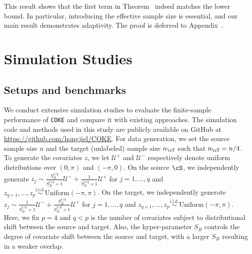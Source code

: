 \documentclass[12pt,a4paper,pdftex,onepage]{article}
\begin{document}
This result shows that the first term in Theorem~ indeed matches the lower bound. In particular, introducing the effective sample size is essential, and our main result demonstrates adaptivity.
The proof is deferred to Appendix~.


\section{Simulation Studies}\label{sec:simu}

\subsection{Setups and benchmarks}

We conduct extensive simulation studies to evaluate the finite-sample performance of \texttt{COKE} and compare it with existing approaches. The simulation code and methods used in this study are publicly available on GitHub at \url{https://github.com/hongjiel/COKE}. For data generation, we set the source sample size $n$ and the target (unlabeled) sample size $n_{\cT}$ such that $n_{\cT}=n/4$. To generate the covariates $z$, we let $\mathcal{U}^+$ and $\mathcal{U}^-$ respectively denote uniform distributions over $(0,\pi)$ and $(-\pi,0)$. On the source $\cS$, we independently generate $z_{j}\sim \frac{S_B^{1/q}}{S_B^{1/q} + 1}\mathcal{U}^-+ \frac{1}{S_B^{1/q} + 1}\mathcal{U}^+$ for $j=1,\ldots,q$ and $z_{q+1}, \ldots, z_{p} \stackrel{\text{i.i.d.}}{\sim} \text{Uniform}(-\pi,\pi)$. On the target, we independently generate $z_{j}\sim \frac{1}{S_B^{1/q} + 1}\mathcal{U}^-+\frac{S_B^{1/q}}{S_B^{1/q} + 1}\mathcal{U}^+$ for $j=1,\ldots,q$ and $z_{q+1}, \ldots, z_{p} \stackrel{\text{i.i.d.}}{\sim} \text{Uniform}(-\pi,\pi)$. Here, we fix $p = 4$ and $q<p$ is the number of covariates subject to distributional shift between the source and target. Also, the hyper-parameter $S_B$ controls the degree of covariate shift between the source and target, with a larger $S_B$ resulting in a weaker overlap.
\end{document}
